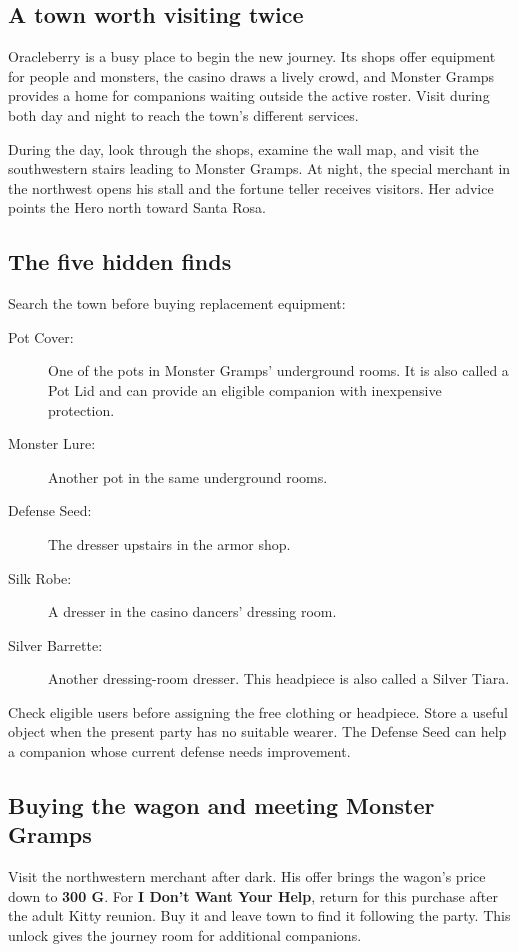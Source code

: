 \subsection*{A town worth visiting twice}

Oracleberry is a busy place to begin the new journey. Its shops offer
equipment for people and monsters, the casino draws a lively crowd, and
Monster Gramps provides a home for companions waiting outside the active
roster. Visit during both day and night to reach the town's different
services.

During the day, look through the shops, examine the wall map, and visit
the southwestern stairs leading to Monster Gramps. At night, the special
merchant in the northwest opens his stall and the fortune teller receives
visitors. Her advice points the Hero north toward Santa Rosa.

\subsection*{The five hidden finds}

Search the town before buying replacement equipment:
\begin{description}
  \item[Pot Cover:] One of the pots in Monster Gramps' underground rooms.
    It is also called a Pot Lid and can provide an eligible companion
    with inexpensive protection.
  \item[Monster Lure:] Another pot in the same underground rooms.
  \item[Defense Seed:] The dresser upstairs in the armor shop.
  \item[Silk Robe:] A dresser in the casino dancers' dressing room.
  \item[Silver Barrette:] Another dressing-room dresser. This headpiece
    is also called a Silver Tiara.
\end{description}

Check eligible users before assigning the free clothing or headpiece.
Store a useful object when the present party has no suitable wearer.
The Defense Seed can help a companion whose current defense needs
improvement.

\subsection*{Buying the wagon and meeting Monster Gramps}

Visit the northwestern merchant after dark. His offer brings the wagon's
price down to \textbf{300 G}. For \textbf{I Don't Want Your Help}, return
for this purchase after the adult Kitty reunion. Buy it and leave town to find it following
the party. This unlock gives the journey room for additional companions.

